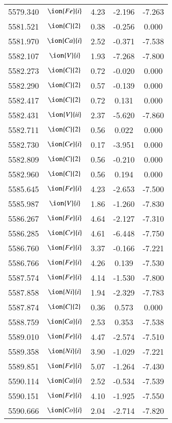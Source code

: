 \documentclass[fleqn,usenatbib]{mnras}
\begin{document}
\begin{center}
\begin{table}
\begin{tabular}{ccccc}
5579.340 &  $\ion{Fe}{i}$  & 4.23 & -2.196 & -7.263 \\ 
5581.521 &  $\ion{C}{2}$ & 0.38 & -0.256 & 0.000 \\ 
5581.970 &  $\ion{Ca}{i}$  & 2.52 & -0.371 & -7.538 \\ 
5582.107 &  $\ion{V}{i}$  & 1.93 & -7.268 & -7.800 \\ 
5582.273 &  $\ion{C}{2}$ & 0.72 & -0.020 & 0.000 \\ 
5582.290 &  $\ion{C}{2}$ & 0.57 & -0.139 & 0.000 \\ 
5582.417 &  $\ion{C}{2}$ & 0.72 & 0.131 & 0.000 \\ 
5582.431 &  $\ion{V}{ii}$  & 2.37 & -5.620 & -7.860 \\ 
5582.711 &  $\ion{C}{2}$ & 0.56 & 0.022 & 0.000 \\ 
5582.730 &  $\ion{Ce}{i}$  & 0.17 & -3.951 & 0.000 \\ 
5582.809 &  $\ion{C}{2}$ & 0.56 & -0.210 & 0.000 \\ 
5582.960 &  $\ion{C}{2}$ & 0.56 & 0.194 & 0.000 \\ 
5585.645 &  $\ion{Fe}{i}$  & 4.23 & -2.653 & -7.500 \\ 
5585.987 &  $\ion{V}{i}$  & 1.86 & -1.260 & -7.830 \\ 
5586.267 &  $\ion{Fe}{i}$  & 4.64 & -2.127 & -7.310 \\ 
5586.285 &  $\ion{Cr}{i}$  & 4.61 & -6.448 & -7.750 \\ 
5586.760 &  $\ion{Fe}{i}$  & 3.37 & -0.166 & -7.221 \\ 
5586.766 &  $\ion{Fe}{i}$  & 4.26 & 0.139 & -7.530 \\ 
5587.574 &  $\ion{Fe}{i}$  & 4.14 & -1.530 & -7.800 \\ 
5587.858 &  $\ion{Ni}{i}$  & 1.94 & -2.329 & -7.783 \\ 
5587.874 &  $\ion{C}{2}$ & 0.36 & 0.573 & 0.000 \\ 
5588.759 &  $\ion{Ca}{i}$  & 2.53 & 0.353 & -7.538 \\ 
5589.010 &  $\ion{Fe}{i}$  & 4.47 & -2.574 & -7.510 \\ 
5589.358 &  $\ion{Ni}{i}$  & 3.90 & -1.029 & -7.221 \\ 
5589.851 &  $\ion{Fe}{i}$  & 5.07 & -1.264 & -7.430 \\ 
5590.114 &  $\ion{Ca}{i}$  & 2.52 & -0.534 & -7.539 \\ 
5590.151 &  $\ion{Fe}{i}$  & 4.10 & -1.925 & -7.550 \\ 
5590.666 &  $\ion{Co}{i}$  & 2.04 & -2.714 & -7.820 \\ 

\end{tabular}
\end{table}
\end{center}
\end{document}
